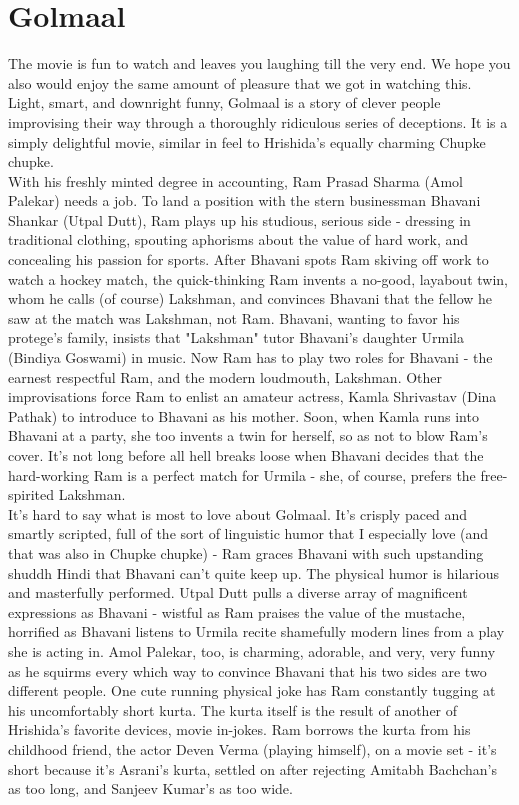 \documentclass{article}
\begin{document}
\section{Golmaal}
The movie is fun to watch and leaves you laughing till the very end. We hope you also would enjoy the same amount of pleasure that we got in watching this.
\\
Light, smart, and downright funny, Golmaal is a story of clever people improvising their way through a thoroughly ridiculous series of deceptions.  It is a simply delightful movie, similar in feel to Hrishida's equally charming Chupke chupke. 
\\
With his freshly minted degree in accounting, Ram Prasad Sharma (Amol Palekar) needs a job.  To land a position with the stern businessman Bhavani Shankar (Utpal Dutt), Ram plays up his studious, serious side - dressing in traditional clothing, spouting aphorisms about the value of hard work, and concealing his passion for sports.  After Bhavani spots Ram skiving off work to watch a hockey match, the quick-thinking Ram invents a no-good, layabout twin, whom he calls (of course) Lakshman, and convinces Bhavani that the fellow he saw at the match was Lakshman, not Ram.  Bhavani, wanting to favor his protege's family, insists that "Lakshman" tutor Bhavani's daughter Urmila (Bindiya Goswami) in music.  Now Ram has to play two roles for Bhavani - the earnest respectful Ram, and the modern loudmouth, Lakshman.  Other improvisations force Ram to enlist an amateur actress, Kamla Shrivastav (Dina Pathak) to introduce to Bhavani as his mother.  Soon, when Kamla runs into Bhavani at a party, she too invents a twin for herself, so as not to blow Ram's cover.  It's not long before all hell breaks loose when Bhavani decides that the hard-working Ram is a perfect match for Urmila - she, of course, prefers the free-spirited Lakshman.
\\
It's hard to say what is most to love about Golmaal.  It's crisply paced and smartly scripted, full of the sort of linguistic humor that I especially love (and that was also in Chupke chupke) - Ram graces Bhavani with such upstanding shuddh Hindi that Bhavani can't quite keep up.  The physical humor is hilarious and masterfully performed.  Utpal Dutt pulls a diverse array of magnificent expressions as Bhavani - wistful as Ram praises the value of the mustache, horrified as Bhavani listens to Urmila recite shamefully modern lines from a play she is acting in.  Amol Palekar, too, is charming, adorable, and very, very funny as he squirms every which way to convince Bhavani that his two sides are two different people.  One cute running physical joke has Ram constantly tugging at his uncomfortably short kurta.  The kurta itself is the result of another of Hrishida's favorite devices, movie in-jokes.  Ram borrows the kurta from his childhood friend, the actor Deven Verma (playing himself), on a movie set - it's short because it's Asrani's kurta, settled on after rejecting Amitabh Bachchan's as too long, and Sanjeev Kumar's as too wide.
\end{document}
